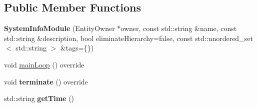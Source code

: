 \subsection*{Public Member Functions}
\begin{DoxyCompactItemize}
\item 
{\bfseries System\+Info\+Module} (Entity\+Owner $\ast$owner, const std\+::string \&name, const std\+::string \&description, bool eliminate\+Hierarchy=false, const std\+::unordered\+\_\+set$<$ std\+::string $>$ \&tags=\{\})\hypertarget{classSystemInfoModule_ab447cebb8cc9cd27cfcd0b1b623684cf}{}\label{classSystemInfoModule_ab447cebb8cc9cd27cfcd0b1b623684cf}

\item 
void \hyperlink{classSystemInfoModule_a876c95c70f1cdf6ffa3f3301f1d1a898}{main\+Loop} () override
\item 
void {\bfseries terminate} () override\hypertarget{classSystemInfoModule_a293bb7cb8a4a0fbd55156251322fa6e2}{}\label{classSystemInfoModule_a293bb7cb8a4a0fbd55156251322fa6e2}

\item 
std\+::string {\bfseries get\+Time} ()\hypertarget{classSystemInfoModule_a78051597f63b4321e6310562ebcb90f1}{}\label{classSystemInfoModule_a78051597f63b4321e6310562ebcb90f1}

\end{DoxyCompactItemize}
